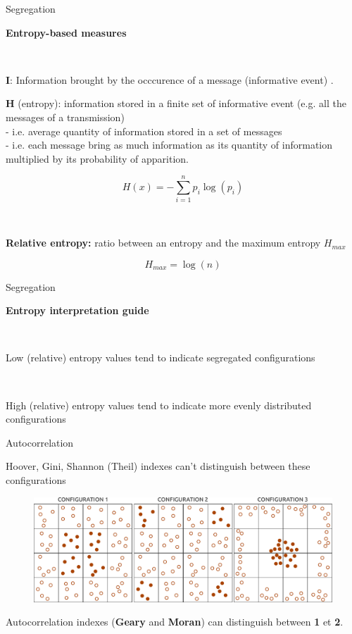 \begin{frame}{Segregation}

\textbf{Entropy-based measures}

~ 

\textbf{I}: Information brought by the occcurence of a message (informative event) . 

\textbf{H} (entropy): information stored in a finite set of informative event (e.g. all the messages of a transmission) \\ 
- i.e. average quantity of information stored in a set of messages \\ 
- i.e. each message bring as much information as its quantity of information multiplied by its probability of apparition.

\begin{equation}
  H(x) = - \sum\limits_{i=1}^n p_i \log(p_i)
  \nonumber
\end{equation}

~

\textbf{Relative entropy:} ratio between an entropy and the maximum entropy $H_{max}$

\begin{equation}
  H_{max} = \log(n)
  \nonumber
\end{equation}

\end{frame}



\begin{frame}{Segregation}

\textbf{Entropy interpretation guide}

~ 

Low (relative) entropy values tend to indicate segregated configurations

~

High (relative) entropy values tend to indicate more evenly distributed configurations



\end{frame}



\begin{frame}{Autocorrelation}

Hoover, Gini, Shannon (Theil) indexes can't distinguish between these configurations \\ 

\begin{figure}
\includegraphics[width=12cm]{NonSpatial.pdf}
\end{figure}

Autocorrelation indexes (\textbf{Geary} and \textbf{Moran}) can distinguish between \textbf{1} et \textbf{2}.

\end{frame}


